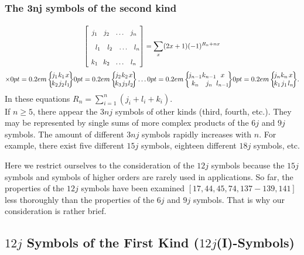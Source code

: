\subsubsection{The 3nj symbols of the second kind}
\begin{multline}
{\left[\begin{array}{cccc}
j_{1} & j_{2} & \ldots & j_{n} \\
\quad l_{1} & \quad l_{2} & \quad\ldots&\quad l_{n} \\
k_{1} & k_{2} & \ldots & l_{n}
\end{array}\right]=\sum_{x}(2 x+1)(-1)^{R_{n}+n x}}  \\
\times\sixj{j_{1}}{k_{1}}{x}{k_{2}}{j_{2}}{l_{1}}\sixj{j_{2}}{k_{2}}{x}{k_{3}}{j_{3}}{l_{2}} \ldots\sixj{j_{n-1}}{k_{n-1}}{x}{k_{n}}{j_{n}}{l_{n-1}}\sixj{j_{n}}{k_{n}}{x}{k_{1}}{j_{1}}{l_{n}} . \label{eq:10:13:2}
\end{multline}
In these equations $R_{n}=\sum_{i=1}^{n}\left(j_{i}+l_{i}+k_{i}\right)$.\\
If $n \geq 5$, there appear the $3 n j$ symbols of other kinds (third, fourth, etc.). They may be represented by single sums of more complex products of the $6 j$ and $9 j$ symbols. The amount of different $3 n j$ symbols rapidly increases with $n$. For example, there exist five different $15 j$ symbols, eighteen different $18 j$ symbols, etc.

Here we restrict ourselves to the consideration of the $12j$ symbols because the $15 j$ symbols and symbols of higher orders are rarely used in applications. So far, the properties of the $12j$ symbols have been examined $[17,44,45,74,137-139,141]$ less thoroughly than the properties of the $6 j$ and $9 j$ symbols. That is why our consideration is rather brief.

\subsection{$12j$ Symbols of the First Kind ($12j$(I)-Symbols)}\label{sec:10.13.2}
